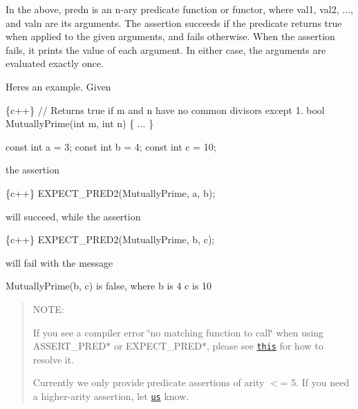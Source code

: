 In the above, {\ttfamily predn} is an {\ttfamily n}-\/ary predicate function or functor, where {\ttfamily val1}, {\ttfamily val2}, ..., and {\ttfamily valn} are its arguments. The assertion succeeds if the predicate returns {\ttfamily true} when applied to the given arguments, and fails otherwise. When the assertion fails, it prints the value of each argument. In either case, the arguments are evaluated exactly once.

Here\textquotesingle{}s an example. Given


\begin{DoxyCode}
\{c++\}
// Returns true if m and n have no common divisors except 1.
bool MutuallyPrime(int m, int n) \{ ... \}

const int a = 3;
const int b = 4;
const int c = 10;
\end{DoxyCode}


the assertion


\begin{DoxyCode}
\{c++\}
  EXPECT\_PRED2(MutuallyPrime, a, b);
\end{DoxyCode}


will succeed, while the assertion


\begin{DoxyCode}
\{c++\}
  EXPECT\_PRED2(MutuallyPrime, b, c);
\end{DoxyCode}


will fail with the message


\begin{DoxyCode}
MutuallyPrime(b, c) is false, where
b is 4
c is 10
\end{DoxyCode}


\begin{quote}
N\+O\+TE\+:


\begin{DoxyEnumerate}
\item If you see a compiler error \char`\"{}no matching function to call\char`\"{} when using {\ttfamily A\+S\+S\+E\+R\+T\+\_\+\+P\+R\+E\+D$\ast$} or {\ttfamily E\+X\+P\+E\+C\+T\+\_\+\+P\+R\+E\+D$\ast$}, please see \href{faq.md#the-compiler-complains-no-matching-function-to-call-when-i-use-assert_pred-how-do-i-fix-it}{\tt this} for how to resolve it.
\end{DoxyEnumerate}
\begin{DoxyEnumerate}
\item Currently we only provide predicate assertions of arity $<$= 5. If you need a higher-\/arity assertion, let \href{https://github.com/google/googletest/issues}{\tt us} know. 
\end{DoxyEnumerate}\end{quote}



